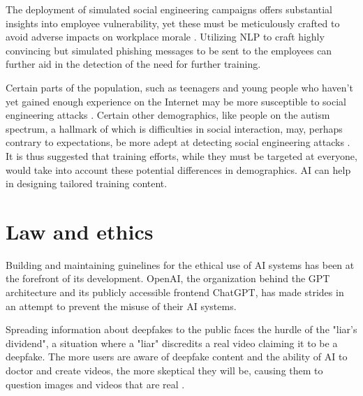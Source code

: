 The deployment of simulated social engineering campaigns offers substantial insights into employee vulnerability, yet these must be meticulously crafted to avoid adverse impacts on workplace morale \citep{mitnick_The_Art_of_Deception_2003}. Utilizing NLP to craft highly convincing but simulated phishing messages to be sent to the employees can further aid in the detection of the need for further training.

Certain parts of the population, such as teenagers and young people who haven't yet gained enough experience on the Internet may be more susceptible to social engineering attacks \citep{nicholsonInvestigatingTeenagersAbilityDetectPhishingMessages2020}. Certain other demographics, like people on the autism spectrum, a hallmark of which is difficulties in social interaction, may, perhaps contrary to expectations, be more adept at detecting social engineering attacks \citep{neupaneDoSocialDisordersFacilitateSocialEngineeringAutismPhishing2018}. It is thus suggested that training efforts, while they must be targeted at everyone, would take into account these potential differences in demographics. AI can help in designing tailored training content.















\section{Law and ethics}
\begin{comment}    
    - Deepfake content detection
    - Spear phishing detection
\end{comment}

Building and maintaining guinelines for the ethical use of AI systems has been at the forefront of its development. OpenAI, the organization behind the GPT architecture and its publicly accessible frontend ChatGPT, has made strides in an attempt to prevent the misuse of their AI systems.

Spreading information about deepfakes to the public faces the hurdle of the "liar's dividend", a situation where a "liar" discredits a real video claiming it to be a deepfake. The more users are aware of deepfake content and the ability of AI to doctor and create videos, the more skeptical they will be, causing them to question images and videos that are real \citep{blauthArtificialIntelligenceCrimeOverviewMaliciousUseAbuse2022}.

